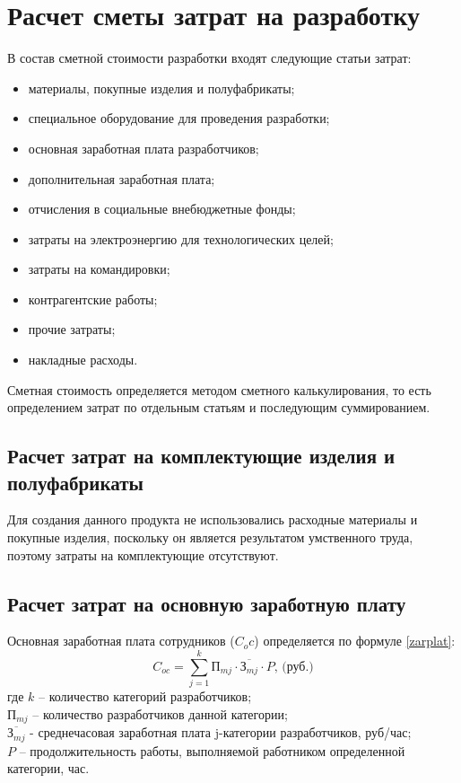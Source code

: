\section{Расчет сметы затрат на разработку}
В состав сметной стоимости разработки входят следующие статьи затрат:
\begin{itemize}
\item материалы, покупные изделия и полуфабрикаты;
\item специальное оборудование для проведения разработки;
\item основная заработная плата разработчиков;
\item дополнительная заработная плата;
\item отчисления в социальные внебюджетные фонды;
\item затраты на электроэнергию для технологических целей;
\item затраты на командировки;
\item контрагентские работы;
\item прочие затраты;
\item накладные расходы.
\end{itemize}
Сметная стоимость определяется методом сметного калькулирования, то есть определением затрат по отдельным статьям и последующим суммированием.

\subsection{Расчет затрат на комплектующие изделия и полуфабрикаты}
Для создания данного продукта не использовались расходные материалы и покупные изделия, поскольку он является результатом умственного труда, поэтому затраты на комплектующие отсутствуют.

\subsection{Расчет затрат на основную заработную плату}
Основная заработная плата сотрудников ($C_oc$) определяется по формуле \ref{zarplat}: 
\begin{equation}
	C_{oc} = \sum_{j=1}^k \textit{П}_{mj} \cdot \overline{\textit{З}_{mj}} \cdot P \mbox{, (руб.)}
	\label{zarplat}
\end{equation}
где  $k$ – количество категорий разработчиков;\\
$\textit{П}_{mj}$ – количество разработчиков данной категории;\\
$\overline{\textit{З}_{mj}}$ - среднечасовая заработная плата j-категории разработчиков, руб/час;\\
$P$ – продолжительность работы, выполняемой работником определенной категории, час.

